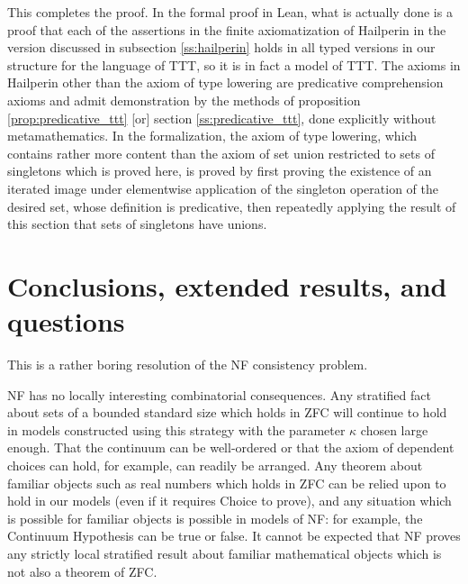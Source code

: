 \documentclass[112pt]{article}
\theoremstyle{definition}
\theoremstyle{remark}
\begin{document}
This completes the proof.  In the formal proof in Lean, what is actually done is a proof that each of the assertions in the finite axiomatization of Hailperin in the version discussed in {subsection \ref{ss:hailperin}}  holds in all typed versions in our structure for the language of TTT, so it is in fact a model of TTT.  The axioms in Hailperin other than the axiom of type lowering are predicative comprehension axioms and
admit demonstration by the methods of {proposition \ref{prop:predicative_ttt} [or] section \ref{ss:predicative_ttt}}, done explicitly without metamathematics.  In the formalization, the axiom of type lowering, which contains rather more content than the axiom of set union restricted to sets of singletons which is proved here, is proved by first proving the existence of an iterated image under elementwise application of the singleton operation of the desired set, whose definition is predicative, then repeatedly applying the result of this section that sets of singletons have unions.
















\newpage

\section{Conclusions, extended results, and questions}
\begin{comment}
[I have copied in the conclusions section of an older version, but what it says should be about right,
and may require some revisions to fit in this paper.  I also added the bibliography, which again is probably approximately the right one.]
\end{comment}

This is a rather boring resolution of the NF consistency problem.

NF has no locally interesting combinatorial consequences.   Any stratified fact about sets of a bounded standard size which holds in ZFC will continue to hold in models constructed using this strategy with the parameter $\kappa$ chosen large enough.
That the continuum can be well-ordered or that the axiom of dependent choices can hold, for example, can readily be arranged.  Any theorem about familiar objects such as real numbers which holds in ZFC can be relied upon to hold in our models
(even if it requires Choice to prove), and any situation which is possible for familiar objects is possible in models of NF:  for example, the Continuum Hypothesis can be true or false.  It cannot be expected that NF proves any strictly local stratified result about familiar mathematical objects which is not also a theorem of ZFC.
\end{document}
